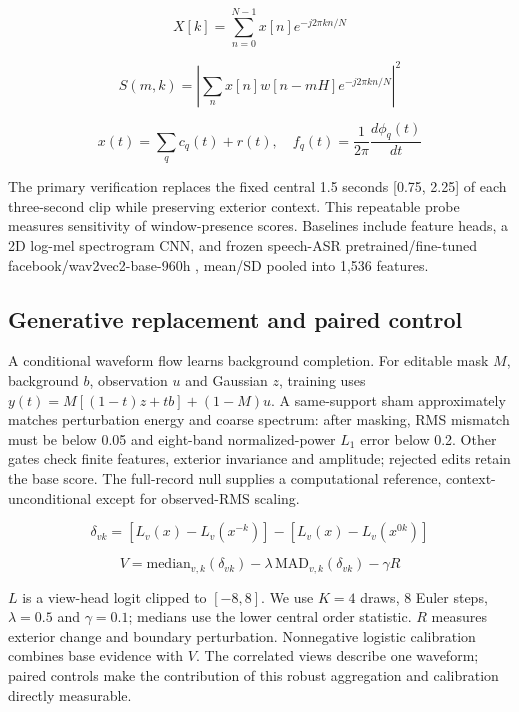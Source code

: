 \documentclass[11pt,letterpaper]{article}
\begin{document}
\begin{equation}\label{eq:fourier}
X[k]=\sum_{n=0}^{N-1}x[n]e^{-j2\pi kn/N}
\end{equation}

\begin{equation}\label{eq:stft}
S(m,k)=\left|\sum_n x[n]w[n-mH]e^{-j2\pi kn/N}\right|^2
\end{equation}

\begin{equation}\label{eq:hht}
x(t)=\sum_q c_q(t)+r(t),\quad f_q(t)=\frac{1}{2\pi}\frac{d\phi_q(t)}{dt}
\end{equation}

The primary verification replaces the fixed central 1.5 seconds [0.75, 2.25] of each three-second clip while preserving exterior context. This repeatable probe measures sensitivity of window-presence scores. Baselines include feature heads, a 2D log-mel spectrogram CNN, and frozen speech-ASR pretrained/fine-tuned facebook/wav2vec2-base-960h \cite{wav2vec2}, mean/SD pooled into 1,536 features.\par

\subsection{Generative replacement and paired control}

A conditional waveform flow \cite{flowmatching} learns background completion. For editable mask \(M\), background \(b\), observation \(u\) and Gaussian \(z\), training uses \(y(t)=M[(1-t)z+tb]+(1-M)u\). A same-support sham approximately matches perturbation energy and coarse spectrum: after masking, RMS mismatch must be below 0.05 and eight-band normalized-power \(L_1\) error below 0.2. Other gates check finite features, exterior invariance and amplitude; rejected edits retain the base score. The full-record null supplies a computational reference, context-unconditional except for observed-RMS scaling.\par

\begin{equation}\label{eq:delta}
\delta_{vk}=[L_v(x)-L_v(x^{-k})]-[L_v(x)-L_v(x^{0k})]
\end{equation}

\begin{equation}\label{eq:score}
V=\mathrm{median}_{v,k}(\delta_{vk})-\lambda\,\mathrm{MAD}_{v,k}(\delta_{vk})-\gamma R
\end{equation}

\(L\) is a view-head logit clipped to \([-8,8]\). We use \(K=4\) draws, 8 Euler steps, \(\lambda=0.5\) and \(\gamma=0.1\); medians use the lower central order statistic. \(R\) measures exterior change and boundary perturbation. Nonnegative logistic calibration combines base evidence with \(V\). The correlated views describe one waveform; paired controls make the contribution of this robust aggregation and calibration directly measurable.\par
\end{document}
